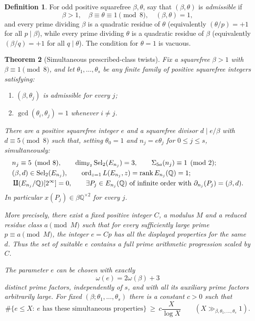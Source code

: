 \documentclass[11pt,a4paper]{article}
\newtheorem{theorem}{Theorem}[section]
\theoremstyle{definition}
\newtheorem{definition}[theorem]{Definition}
\newcommand{\FF}{\mathbb F_2}
\newcommand{\QQ}{\mathbb Q}
\newcommand{\rank}{\operatorname{rank}}
\newcommand{\Sel}{\operatorname{Sel}_2}
\newcommand{\Sha}{\operatorname{\mathrlap{\mathchoice{\raisebox{.13ex}{$\displaystyle\amalg$}}{\raisebox{.13ex}{$\textstyle\amalg$}}{\amalg}{\amalg}}\amalg}}
\begin{document}
\begin{definition}\label{def:admissible}
For odd positive squarefree $\beta,\theta$, say that $(\beta,\theta)$
is \emph{admissible} if
\[
 \beta>1,\quad \beta\equiv\theta\equiv1\pmod8,\quad
 (\beta,\theta)=1,
\]
and every prime dividing $\beta$ is a quadratic residue of $\theta$
(equivalently $(\theta/p)=+1$ for all $p\mid\beta$), while every
prime dividing $\theta$ is a quadratic residue of $\beta$
(equivalently $(\beta/q)=+1$ for all $q\mid\theta$).
The condition for $\theta=1$ is vacuous.
\end{definition}

\begin{theorem}[Simultaneous prescribed-class twists]\label{thm:sim}
Fix a squarefree $\beta>1$ with $\beta\equiv1\pmod8$, and let
$\theta_1,\ldots,\theta_s$ be any finite family of positive squarefree
integers satisfying:
\begin{enumerate}[label=\textup{(a)},itemsep=2pt]
\item $(\beta,\theta_j)$ is admissible for every $j$;
\item $\gcd(\theta_i,\theta_j)=1$ whenever $i\ne j$.
\end{enumerate}
There are a positive squarefree integer $e$ and a squarefree divisor
$d\mid e/\beta$ with $d\equiv5\pmod8$ such that, setting
$\theta_0=1$ and $n_j=e\theta_j$ for $0\le j\le s$, simultaneously:
\begin{align*}
 &n_j\equiv5\pmod8,\qquad \dim_{\FF}\Sel(E_{n_j})=3,\qquad
          \Sigma_{5a}(n_j)\equiv1\pmod2;\\
 &(\beta,d)\in\Sel(E_{n_j}),\qquad
    \operatorname{ord}_{z=1}L(E_{n_j},z)
      =\rank E_{n_j}(\QQ)=1;\\
 &\Sha(E_{n_j}/\QQ)[2^\infty]=0,\qquad
   \exists P_j\in E_{n_j}(\QQ)\text{ of infinite order with }
     \partial_{n_j}(P_j)=(\beta,d).
\end{align*}
In particular $x(P_j)\in\beta\QQ^{\times2}$ for every $j$.

More precisely, there exist a fixed positive integer $C$, a modulus
$M$ and a reduced residue class $a\pmod M$ such that for every
sufficiently large prime $p\equiv a\pmod M$, the integer $e=Cp$
has all the displayed properties for the same $d$.  Thus the
set of suitable $e$ contains a full prime arithmetic progression
scaled by $C$.

The parameter $e$ can be chosen with exactly
\[
                        \omega(e)=2\omega(\beta)+3
\]
distinct prime factors, independently of $s$, and with all its
auxiliary prime factors arbitrarily large.
For fixed $(\beta;\theta_1,\dots,\theta_s)$ there is a constant
$c>0$ such that
\[
 \#\{e\le X:\ e\text{ has these simultaneous properties}\}
                      \ \ge\ c\frac{X}{\log X}
                  \qquad(X\gg_{\beta,\theta_1,\dots,\theta_s}1).
\]
\end{theorem}
\end{document}
